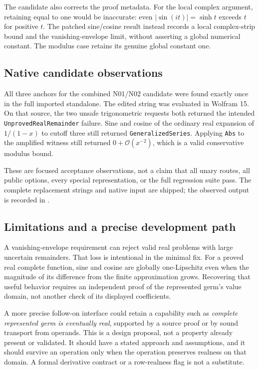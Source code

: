 \documentclass[11pt,a4paper]{article}
\newcommand{\OO}{\mathcal O}
\begin{document}
The candidate also corrects the proof metadata. For the local complex argument, retaining  equal to one would be inaccurate: even $|\sin(it)|=\sinh t$ exceeds $t$ for positive $t$. The patched sine/cosine result instead records a local complex-strip bound and the vanishing-envelope limit, without asserting a global numerical constant. The modulus case retains its genuine global constant one.

\subsection{Native candidate observations}
All three anchors for the combined N01/N02 candidate were found exactly once in the full imported standalone. The edited string was evaluated in Wolfram 15. On that source, the two unsafe trigonometric requests both returned the intended \texttt{UnprovedRealRemainder} failure. Sine and cosine of the ordinary real expansion of $1/(1-x)$ to cutoff three still returned \texttt{GeneralizedSeries}. Applying \texttt{Abs} to the amplified witness still returned $0+\OO(x^{-2})$, which is a valid conservative modulus bound.

These are focused acceptance observations, not a claim that all unary routes, all public options, every special representation, or the full regression suite pass. The complete replacement strings and native input are shipped; the observed output is recorded in .

\subsection{Limitations and a precise development path}
A vanishing-envelope requirement can reject valid real problems with large uncertain remainders. That loss is intentional in the minimal fix. For a proved real complete function, sine and cosine are globally one-Lipschitz even when the magnitude of its difference from the finite approximation grows. Recovering that useful behavior requires an independent proof of the represented germ's value domain, not another check of its displayed coefficients.

A more precise follow-on interface could retain a capability such as \emph{complete represented germ is eventually real}, supported by a source proof or by sound transport from operands. This is a design proposal, not a property already present or validated. It should have a stated approach and assumptions, and it should survive an operation only when the operation preserves realness on that domain. A formal derivative contract or a row-realness flag is not a substitute.
\end{document}
